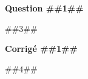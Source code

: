 \documentclass[11pt]{article}
\begin{document}



\textbf{Question ##{{1}}##} \par
##{{3}}## \par




\textbf{Corrigé ##{{1}}##} \par
##{{4}}## \par



\end{document}
